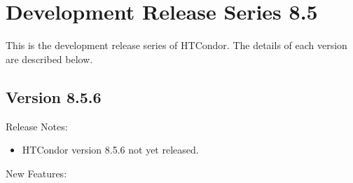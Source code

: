 
\section{\label{sec:History-8-5}Development Release Series 8.5}

This is the development release series of HTCondor.
The details of each version are described below.

\subsection*{\label{sec:New-8-5-6}Version 8.5.6}

\noindent Release Notes:

\begin{itemize}

\item HTCondor version 8.5.6 not yet released.

\end{itemize}


\noindent New Features:

